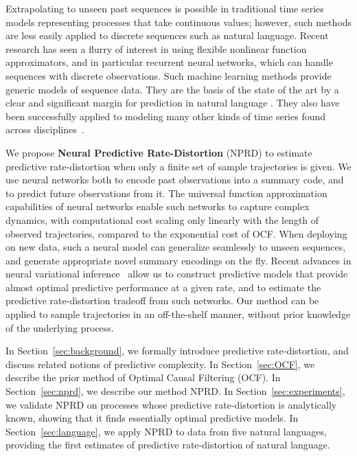 \documentclass[entropy,article,submit,moreauthors,pdftex,10pt,a4paper]{Definitions/mdpi}
\newcommand{\key}{\textbf}
\begin{document}
Extrapolating to unseen past sequences is possible in traditional time series models representing processes that take continuous values; however, such methods are less easily applied to discrete sequences such as natural language.
Recent research has seen a flurry of interest in using flexible nonlinear function approximators, and in particular recurrent neural networks, which can handle sequences with discrete observations.
Such machine learning methods provide generic models of sequence data.
They are the basis of the state of the art by a clear and significant margin for prediction in natural language \citep{DBLP:journals/corr/JozefowiczVSSW16, merity2018analysis, dai2019transformer,takahashi2018cross}.
They also have been successfully applied to modeling many other kinds of time series found across disciplines~\citep{ogunmolu2016nonlinear,laptev2017time,meyer2018survey,hundman2018detecting,white2018forecasting,woo2018dynamic,sirignano2018universal,mohajerin2019multistep}. %

We propose \key{Neural Predictive Rate-Distortion} (NPRD) to estimate predictive rate-distortion when only a finite set of sample trajectories is given.
We use neural networks both to encode past observations into a summary code, and to predict future observations from it.
The universal function approximation capabilities of neural networks enable such networks to capture complex dynamics, with computational cost scaling only linearly with the length of observed trajectories, compared to the exponential cost of OCF.
When deploying on new data, such a neural model can generalize seamlessly to unseen sequences, and generate appropriate novel summary encodings on the fly.
Recent advances in neural variational inference~\citep{rezende-variational-2015,huang-neural-2018} allow us to construct predictive models that provide almost optimal predictive performance at a given rate, and to estimate the predictive rate-distortion tradeoff from such networks.
Our method can be applied to sample trajectories in an off-the-shelf manner, without prior knowledge of the underlying process.

In Section~\ref{sec:background}, we formally introduce predictive rate-distortion, and discuss related notions of predictive complexity.
In Section~\ref{sec:OCF}, we describe the prior method of Optimal Causal Filtering (OCF).
In Section~\ref{sec:nprd}, we describe our method NPRD.
In Section~\ref{sec:experiments}, we validate NPRD on processes whose predictive rate-distortion is analytically known, showing that it finds essentially optimal predictive models.
In Section~\ref{sec:language}, we apply NPRD to data from five natural languages, providing the first estimates of predictive rate-distortion of natural language.
\end{document}
